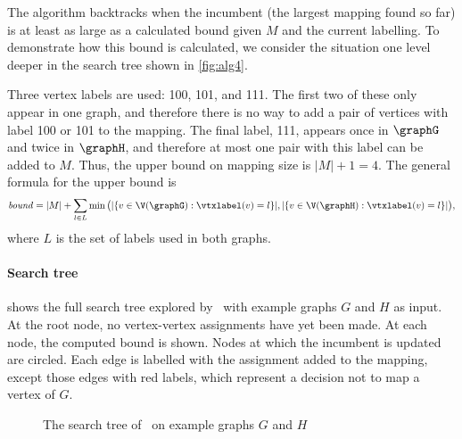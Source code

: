 The algorithm backtracks when the incumbent (the largest mapping found so far) is at least as large
as a calculated bound given $M$ and the current labelling. To demonstrate how
this bound is calculated, we consider the situation one level deeper in the
search tree shown in \cref{fig:alg4}.

Three vertex labels are used: 100,
101, and 111.  The first two of these only appear in one graph, and therefore
there is no way to add a pair of vertices with label 100 or 101 to the mapping.
The final label, 111, appears once in $\graphG$ and twice in $\graphH$, and therefore at
most one pair with this label can be added to $M$.  Thus, the upper bound on
mapping size is $|M| + 1 = 4$. The general formula for the upper bound is
\begin{multline*}
    \mathit{bound} = |M| + \sum_{l \in L} \min\big(|\{ v \in \V(\graphG) : \vtxlabel(v)=l\}|,
        |\{ v \in \V(\graphH) : \vtxlabel(v)=l \}|\big) \text{,}
\end{multline*} where $L$ is the set of labels used in both graphs.


\paragraph{Search tree}  shows the full search
tree explored by \McSplit\ with example graphs $G$ and $H$ as input.
At the root node, no vertex-vertex assignments have yet been made.  At each node,
the computed bound is shown.  Nodes at which the incumbent is updated are circled.
Each edge is labelled with the assignment added to the mapping, except those edges
with red labels, which represent a decision not to map a vertex of $G$.

\begin{figure}[htb]
    \centering
    
    \caption{The search tree of \McSplit\ on example graphs $G$ and $H$}
    \label{figure:mcsplit-search-tree}
\end{figure}


